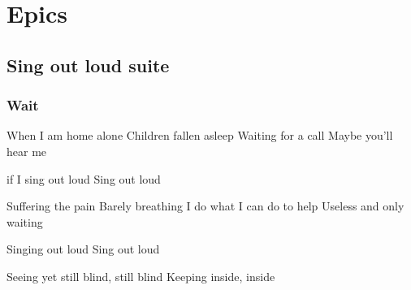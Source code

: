 \documentclass{article}
\newenvironment{album}[1]%
{%
  \section*{#1}
}%
{%
}
\newenvironment{song}[1]%
{%
  \subsection*{\textbf{#1}}
  \begin{multicols*}{2}
}%
{%
  \end{multicols*}
  \newpage
}
\newenvironment{partie}[1]%
{%
  \subsubsection{#1}
}%
{%
}
\newenvironment{couplet} %
{%
  \verbatim
}%
{% end code
  \endverbatim
}
\newenvironment{refrain} %
{%
  \verbatim
}%
{% end code
  \endverbatim
}
\newenvironment{prerefrain} %
{%
  \verbatim
}%
{% end code
  \endverbatim
}
\begin{document}
\begin{album}{Epics}
\begin{song}{Sing out loud suite}
\begin{partie}{Wait}
\begin{couplet}
When I am home alone
Children fallen asleep
Waiting for a call
Maybe you'll hear me
\end{couplet}
\begin{prerefrain}
if I sing out loud
Sing out loud  
\end{prerefrain}
\begin{couplet}
Suffering the pain
Barely breathing
I do what I can do to help
Useless and only waiting  
\end{couplet}
\begin{prerefrain}
Singing out loud
Sing out loud 
\end{prerefrain}
\begin{refrain}
Seeing yet still blind, still blind
Keeping inside, inside 
\end{refrain}
\end{partie}


\end{song}
\end{album}
\end{document}
